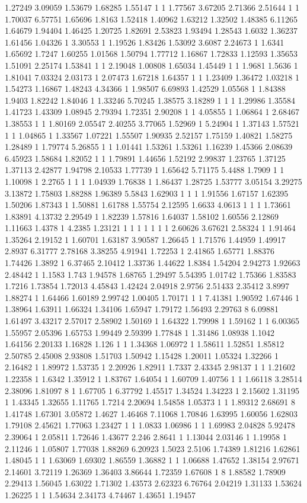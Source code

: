 1.27249 3.09059 1.53679 1.68285 1.55147 1 1 1.77567 3.67205 2.71366 2.51644 1 1 1.70037 6.57751 1.65696 1.8163 1.52418 1.40962 1.63212 1.32502 1.48385 6.11265 1.64679 1.94404 1.46425 1.20725 1.82691 2.53823 1.93494 1.28543 1.6032 1.36237 1.61456 1.04326 1 3.30553 1 1.19526 1.83426 1.53092 3.6087 2.24673 1 1.6341 1.65692 1.7247 1.60255 1.01568 1.50794 1.77712 1.16867 1.72833 1.12593 1.35653 1.51091 2.25174 1.53841 1 1 2.19048 1.00808 1.65034 1.45449 1 1 1.9681 1.5636 1 1.81041 7.03324 2.03173 1 2.07473 1.67218 1.64357 1 1 1.23409 1.36472 1.03218 1 1.54273 1.16867 1.48243 4.34366 1 1.98507 6.69893 1.42529 1.05568 1 1.84388 1.9403 1.82242 1.84046 1 1.33246 5.70245 1.38575 3.18289 1 1 1 1.29986 1.35584 1.41723 1.43309 1.08945 2.79394 1.72351 2.90208 1 1 4.05855 1 1.06864 1 2.68467 1.38553 1 1 1.80169 2.05547 2.40255 3.77065 1.52969 1 5.24904 1 1.37143 1.57521 1 1 1.04865 1 1.33567 1.07221 1.55507 1.90935 2.52157 1.75159 1.40821 1.58275 1.28489 1 1.79774 5.26855 1 1 1.01441 1.53261 1.53261 1.16239 1.45366 2.08639 6.45923 1.58684 1.82052 1 1 1.79891 1.44656 1.52192 2.99837 1.23765 1.37125 1.37113 2.42877 1.94798 2.10533 1.77739 1 1.65642 5.71175 5.4488 1.7909 1 1 1.10098 1 2.2765 1 1 1 1.04939 1.76838 1 1.86437 1.28725 1.53777 3.05154 3.29275 3.13872 1.75803 1.88288 1.96389 5.5843 1.62903 1 1 1 1.91556 1.67157 1.62395 1.50206 1.87343 1 1.50881 1.61788 1.55754 2.12595 1.6633 4.0613 1 1 1 1.73661 1.83891 4.13732 2.29549 1 1.82239 1.57816 1.64037 1.58102 1.60556 2.12869 1.11663 1.4378 1 4.2385 1.23121 1 1 1 1 1 1 1 2.60626 3.67621 2.58324 1 1.91464 1.35264 2.19152 1 1.60701 1.63187 3.90587 1.26645 1 1.71576 1.44959 1.49917 2.8937 6.31777 2.78168 3.38255 4.91941 1.72253 1 2.41865 1.65771 1.88376 1.74426 1.3892 1 6.37465 2.10412 1.33736 1.44622 1.8384 1.54204 2.94273 1.92663 2.48442 1 1.1583 1.743 1.94578 1.68765 1.29497 5.54395 1.01742 1.75366 1.83583 1.7216 1.73854 1.72013 4.45843 1.42424 2.04918 2.9756 2.51433 2.35412 3.8997 1.88274 1 1.64466 1.60189 2.99742 1.00405 1.70171 1 1 7.41381 1.90592 1.67446 1 1.38964 1.63911 1.66324 1.34106 1.65947 1.79172 1.56493 2.29763 8 6.09881 1.61497 3.43217 2.57017 2.58902 1.50169 1 1.64322 1.79998 1 1.59162 1 1 6.00365 1.55957 2.05396 1.65753 1.99449 2.59399 1.77848 1 1.31486 1.08938 1.1042 1.64156 2.20133 1.16828 1.126 1 1 1.34368 1.06972 1 1.58611 1.52851 1.85812 2.50785 2.45008 2.93808 1.51703 1.50942 1.15428 1.20011 1.05324 1.32266 1 2.16482 1 1.89972 1.53735 1 2.20926 1.82911 1.7337 2.43345 2.98137 1 1 1.21602 1.22358 1 1.6342 1.35912 1 1.83767 1.64054 1 1.60709 1.40756 1 1 1.66118 3.28514 2.38096 1.81097 8 1 1.67705 1 6.37792 1.45517 1.34524 1.34223 1 2.15602 1.31195 1 1.43345 1.32655 1.11765 1.7214 2.20694 1.54858 1.05373 1 1 1.89312 2.68691 8 1.41748 1.67301 3.05872 1.4627 1.46468 7.11068 1.70846 1.63995 1.60056 1.62803 1.79108 2.45621 1.77063 1.23427 1 1 1.0833 1.06986 1 1 1.69983 2.04828 5.92478 2.39064 1 2.05811 1.72646 1.43677 2.246 2.8641 1 1.13044 2.03146 1 1.19958 1 2.11246 1 1.05807 1.77038 1.88269 6.20923 1.5023 2.5106 1.74389 1.81216 1.62861 1.48045 1 1 1.63069 1.69302 1.86559 1.36882 1 1 1.06688 1.47652 1.38154 2.97671 2.14601 3.72119 1.26369 1.36403 3.86644 1.72359 1.67608 1 8 1.88582 1.78909 2.29413 1.56045 1.63022 1.71302 1.43573 2.62323 6.76764 2.04219 1.31133 1.53624 1.26225 1 1 1.54634 2.34173 4.74467 1.43651 1.19457 